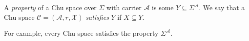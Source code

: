 \documentclass[12pt]{article}
\begin{document}
A \emph{property} of a Chu space over $\Sigma$ with carrier $\mathcal{A}$ is some $Y\subseteq \Sigma^\mathcal{A}$.  We say that a Chu space $\mathcal{C}=(\mathcal{A},r,\mathcal{X})$ \emph{satisfies} $Y$ if $X\subseteq Y$.

For example, every Chu space satisfies the property $\Sigma^\mathcal{A}$.
\end{document}
